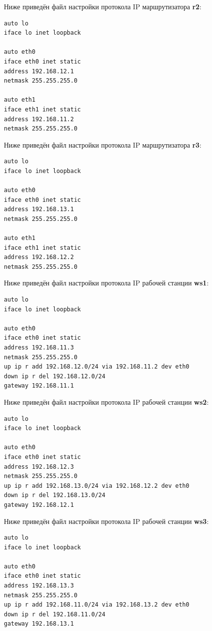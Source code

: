 \documentclass[a4paper,12pt]{article}
\begin{document}
Ниже приведён файл настройки протокола IP маршрутизатора \textbf{r2}:

\begin{Verbatim}
auto lo
iface lo inet loopback

auto eth0
iface eth0 inet static
address 192.168.12.1
netmask 255.255.255.0

auto eth1
iface eth1 inet static
address 192.168.11.2
netmask 255.255.255.0
\end{Verbatim}

Ниже приведён файл настройки протокола IP маршрутизатора \textbf{r3}:

\begin{Verbatim}
auto lo
iface lo inet loopback

auto eth0
iface eth0 inet static
address 192.168.13.1
netmask 255.255.255.0

auto eth1
iface eth1 inet static
address 192.168.12.2
netmask 255.255.255.0
\end{Verbatim}

Ниже приведён файл настройки протокола IP рабочей станции \textbf{ws1}:

\begin{Verbatim}
auto lo
iface lo inet loopback

auto eth0
iface eth0 inet static
address 192.168.11.3
netmask 255.255.255.0
up ip r add 192.168.12.0/24 via 192.168.11.2 dev eth0
down ip r del 192.168.12.0/24
gateway 192.168.11.1
\end{Verbatim}

Ниже приведён файл настройки протокола IP рабочей станции \textbf{ws2}:

\begin{Verbatim}
auto lo
iface lo inet loopback

auto eth0
iface eth0 inet static
address 192.168.12.3
netmask 255.255.255.0
up ip r add 192.168.13.0/24 via 192.168.12.2 dev eth0
down ip r del 192.168.13.0/24
gateway 192.168.12.1
\end{Verbatim}

Ниже приведён файл настройки протокола IP рабочей станции \textbf{ws3}:

\begin{Verbatim}
auto lo
iface lo inet loopback

auto eth0
iface eth0 inet static
address 192.168.13.3
netmask 255.255.255.0
up ip r add 192.168.11.0/24 via 192.168.13.2 dev eth0
down ip r del 192.168.11.0/24
gateway 192.168.13.1
\end{Verbatim}
\end{document}

